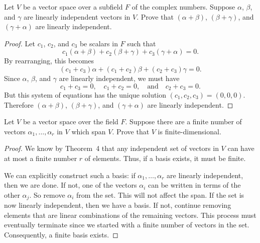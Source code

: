 \label{exercise:vec-spaces:independence-of-sums}
Let $V$ be a vector space over a subfield $F$ of the complex
numbers. Suppose $\alpha$, $\beta$, and $\gamma$ are linearly
independent vectors in $V$. Prove that $(\alpha + \beta)$,
$(\beta + \gamma)$, and $(\gamma + \alpha)$ are linearly independent.
\begin{proof}
  Let $c_1$, $c_2$, and $c_3$ be scalars in $F$ such that
  \begin{equation*}
    c_1(\alpha + \beta) + c_2(\beta + \gamma) + c_3(\gamma + \alpha) = 0.
  \end{equation*}
  By rearranging, this becomes
  \begin{equation*}
    (c_1 + c_3)\alpha + (c_1 + c_2)\beta + (c_2 + c_3)\gamma = 0.
  \end{equation*}
  Since $\alpha$, $\beta$, and $\gamma$ are linearly independent, we
  must have
  \begin{equation*}
    c_1 + c_3 = 0, \quad c_1 + c_2 = 0,
    \quad\text{and}\quad c_2 + c_3 = 0.
  \end{equation*}
  But this system of equations has the unique solution
  $(c_1,c_2,c_3) = (0, 0, 0)$. Therefore $(\alpha + \beta)$,
  $(\beta + \gamma)$, and $(\gamma + \alpha)$ are linearly
  independent.
\end{proof}

 Let $V$ be a vector space over the field $F$. Suppose
there are a finite number of vectors $\alpha_1, \dots, \alpha_r$ in
$V$ which span $V$. Prove that $V$ is finite-dimensional.
\begin{proof}
  We know by Theorem~4 that any independent set of vectors in $V$ can
  have at most a finite number $r$ of elements. Thus, if a basis
  exists, it must be finite.

  We can explicitly construct such a basis: if
  $\alpha_1,\dots,\alpha_r$ are linearly independent, then we are
  done. If not, one of the vectors $\alpha_i$ can be written in terms
  of the other $\alpha_j$. So remove $\alpha_i$ from the set. This
  will not affect the span. If the set is now linearly independent,
  then we have a basis. If not, continue removing elements that are
  linear combinations of the remaining vectors. This process must
  eventually terminate since we started with a finite number of
  vectors in the set. Consequently, a finite basis exists.
\end{proof}

